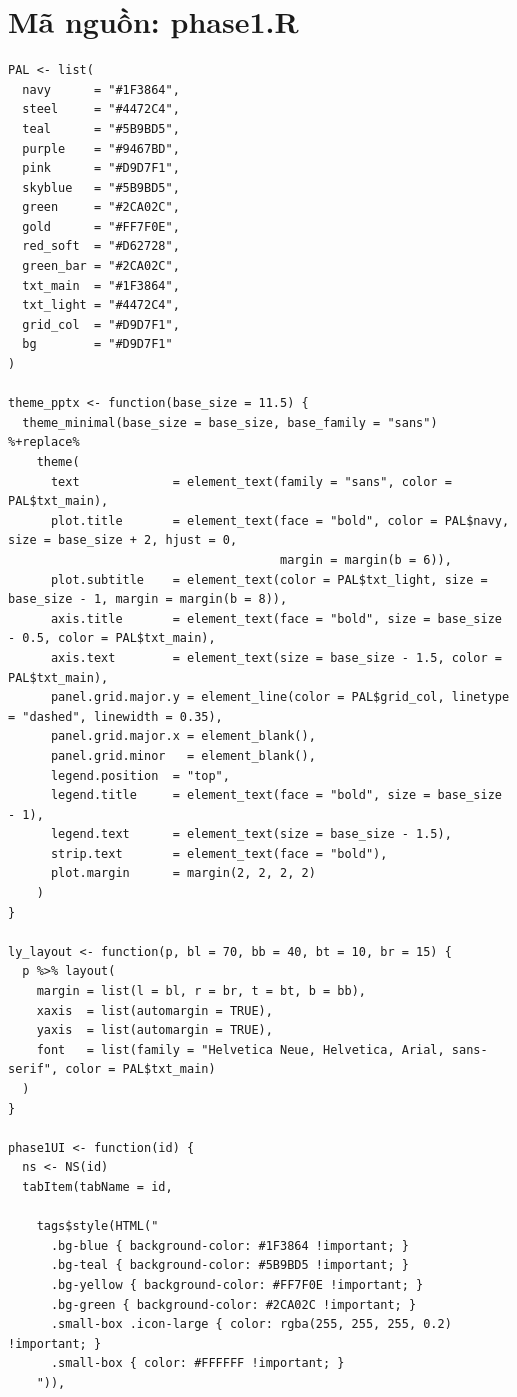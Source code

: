 \documentclass[12pt, a4paper]{article}
\begin{document}
\section{Mã nguồn: phase1.R}
\begin{lstlisting}
PAL <- list(
  navy      = "#1F3864",   
  steel     = "#4472C4",   
  teal      = "#5B9BD5",   
  purple    = "#9467BD",   
  pink      = "#D9D7F1",   
  skyblue   = "#5B9BD5",   
  green     = "#2CA02C",   
  gold      = "#FF7F0E",   
  red_soft  = "#D62728",   
  green_bar = "#2CA02C",   
  txt_main  = "#1F3864",   
  txt_light = "#4472C4",   
  grid_col  = "#D9D7F1",   
  bg        = "#D9D7F1"    
)

theme_pptx <- function(base_size = 11.5) {
  theme_minimal(base_size = base_size, base_family = "sans") %+replace%
    theme(
      text             = element_text(family = "sans", color = PAL$txt_main),
      plot.title       = element_text(face = "bold", color = PAL$navy, size = base_size + 2, hjust = 0,
                                      margin = margin(b = 6)),
      plot.subtitle    = element_text(color = PAL$txt_light, size = base_size - 1, margin = margin(b = 8)),
      axis.title       = element_text(face = "bold", size = base_size - 0.5, color = PAL$txt_main),
      axis.text        = element_text(size = base_size - 1.5, color = PAL$txt_main),
      panel.grid.major.y = element_line(color = PAL$grid_col, linetype = "dashed", linewidth = 0.35),
      panel.grid.major.x = element_blank(),
      panel.grid.minor   = element_blank(),
      legend.position  = "top",
      legend.title     = element_text(face = "bold", size = base_size - 1),
      legend.text      = element_text(size = base_size - 1.5),
      strip.text       = element_text(face = "bold"),
      plot.margin      = margin(2, 2, 2, 2)
    )
}

ly_layout <- function(p, bl = 70, bb = 40, bt = 10, br = 15) {
  p %>% layout(
    margin = list(l = bl, r = br, t = bt, b = bb),
    xaxis  = list(automargin = TRUE),
    yaxis  = list(automargin = TRUE),
    font   = list(family = "Helvetica Neue, Helvetica, Arial, sans-serif", color = PAL$txt_main)
  )
}

phase1UI <- function(id) {
  ns <- NS(id)
  tabItem(tabName = id,

    tags$style(HTML("
      .bg-blue { background-color: #1F3864 !important; }
      .bg-teal { background-color: #5B9BD5 !important; }
      .bg-yellow { background-color: #FF7F0E !important; }
      .bg-green { background-color: #2CA02C !important; }
      .small-box .icon-large { color: rgba(255, 255, 255, 0.2) !important; }
      .small-box { color: #FFFFFF !important; }
    ")),


\end{lstlisting}
\end{document}
